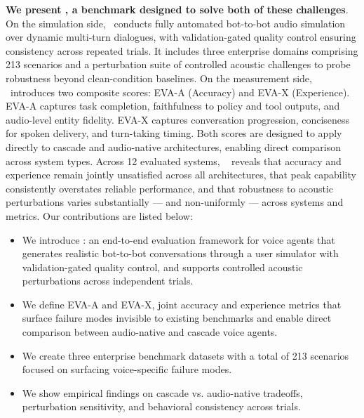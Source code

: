 \textbf{We present \framework, a benchmark designed to solve both of these challenges}. On the simulation side, \framework~conducts fully automated bot-to-bot audio simulation over dynamic multi-turn dialogues, with validation-gated quality control ensuring consistency across repeated trials. It includes three enterprise domains comprising 213 scenarios and a perturbation suite of controlled acoustic challenges to probe robustness beyond clean-condition baselines. On the measurement side, \framework~introduces two composite scores: EVA-A (Accuracy) and EVA-X (Experience). EVA-A captures task completion, faithfulness to policy and tool outputs, and audio-level entity fidelity. EVA-X captures conversation progression, conciseness for spoken delivery, and turn-taking timing. Both scores are designed to apply directly to cascade and audio-native architectures, enabling direct comparison across system types. Across 12 evaluated systems, \framework~ reveals that accuracy and experience remain jointly unsatisfied across all architectures, that peak capability consistently overstates reliable performance, and that robustness to acoustic perturbations varies substantially — and non-uniformly — across systems and metrics.
Our contributions are listed below:
\begin{itemize}
\item We introduce \framework: an end-to-end evaluation framework for voice agents that generates realistic bot-to-bot conversations through a user simulator with validation-gated quality control, and supports controlled acoustic perturbations across independent trials.
\item We define EVA-A and EVA-X, joint accuracy and experience metrics that surface failure modes invisible to existing benchmarks and enable direct comparison between audio-native and cascade voice agents.
\item We create three enterprise benchmark datasets with a total of 213 scenarios focused on surfacing voice-specific failure modes.
\item We show empirical findings on cascade vs. audio-native tradeoffs, perturbation sensitivity, and behavioral consistency across trials.
\end{itemize}
